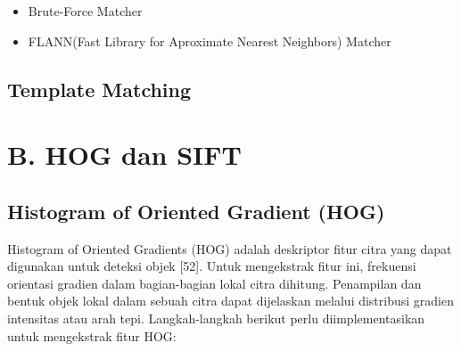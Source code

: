 \documentclass[
  letterpaper,
  DIV=11,
  numbers=noendperiod]{scrreprt}
\providecommand{\tightlist}{%
  \setlength{\itemsep}{0pt}\setlength{\parskip}{0pt}}\usepackage{longtable,booktabs,array}
\begin{document}
\begin{itemize}
\tightlist
\item
  Brute-Force Matcher\\
\item
  FLANN(Fast Library for Aproximate Nearest Neighbors) Matcher
\end{itemize}

\hypertarget{template-matching}{%
\subsection*{Template Matching}\label{template-matching}}

\hypertarget{b.-hog-dan-sift}{%
\section*{B. HOG dan SIFT}\label{b.-hog-dan-sift}}


\hypertarget{histogram-of-oriented-gradient-hog}{%
\subsection*{Histogram of Oriented Gradient
(HOG)}\label{histogram-of-oriented-gradient-hog}}

Histogram of Oriented Gradients (HOG) adalah deskriptor fitur citra yang
dapat digunakan untuk deteksi objek {[}52{]}. Untuk mengekstrak fitur
ini, frekuensi orientasi gradien dalam bagian-bagian lokal citra
dihitung. Penampilan dan bentuk objek lokal dalam sebuah citra dapat
dijelaskan melalui distribusi gradien intensitas atau arah tepi.
Langkah-langkah berikut perlu diimplementasikan untuk mengekstrak fitur
HOG:
\end{document}
